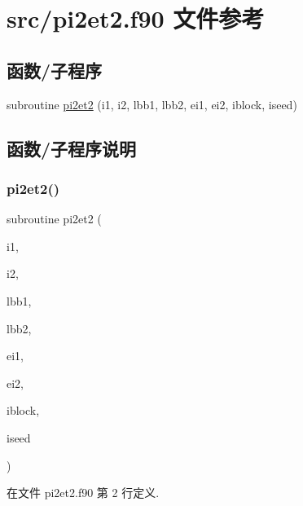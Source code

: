 \hypertarget{pi2et2_8f90}{}\section{src/pi2et2.f90 文件参考}
\label{pi2et2_8f90}
\subsection*{函数/子程序}
\begin{DoxyCompactItemize}
\item 
subroutine \mbox{\hyperlink{pi2et2_8f90_ae934a0c9b5d6ad52a5ed544c432ece9e}{pi2et2}} (i1, i2, lbb1, lbb2, ei1, ei2, iblock, iseed)
\end{DoxyCompactItemize}


\subsection{函数/子程序说明}
\mbox{\label{pi2et2_8f90_ae934a0c9b5d6ad52a5ed544c432ece9e}} 
\subsubsection{\texorpdfstring{pi2et2()}{pi2et2()}}
{\footnotesize\ttfamily subroutine pi2et2 (\begin{DoxyParamCaption}\item[{}]{i1,  }\item[{}]{i2,  }\item[{}]{lbb1,  }\item[{}]{lbb2,  }\item[{}]{ei1,  }\item[{}]{ei2,  }\item[{}]{iblock,  }\item[{}]{iseed }\end{DoxyParamCaption})}



在文件 pi2et2.\+f90 第 2 行定义.

